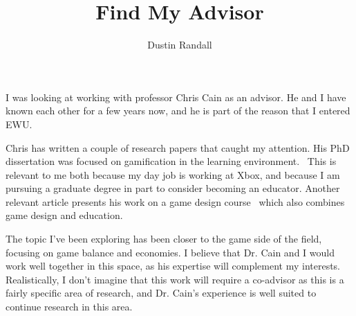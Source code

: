 \documentclass[letterpaper,twocolumn,10pt]{article}
\begin{document}
\title{Find My Advisor}
\author{Dustin Randall}
\maketitle

I was looking at working with professor Chris Cain as an advisor.
He and I have known each other for a few years now, and he is part of the reason that I entered EWU.

Chris has written a couple of research papers that caught my attention. 
His PhD dissertation was focused on gamification in the learning environment.~\cite{cain_tingle_2018}
This is relevant to me both because my day job is working at Xbox, and because I am pursuing a graduate degree in part to consider becoming an educator.
Another relevant article presents his work on a game design course~\cite{pacise_proceedings_2022} which also combines game design and education.

The topic I've been exploring has been closer to the game side of the field, focusing on game balance and economies.
I believe that Dr. Cain and I would work well together in this space, as his expertise will complement my interests.
Realistically, I don't imagine that this work will require a co-advisor as this is a fairly specific area of research, and Dr. Cain's experience is well suited to continue research in this area.



\end{document}
